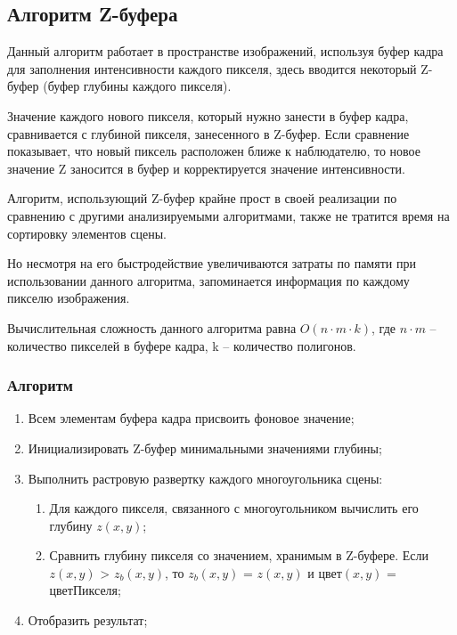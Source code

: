 \documentclass[a4paper,14pt]{extreport}
\begin{document}
		\subsection{Алгоритм Z-буфера}
		Данный алгоритм работает в пространстве изображений, используя буфер
кадра для заполнения интенсивности каждого пикселя, здесь вводится
некоторый Z-буфер (буфер глубины каждого пикселя).
\par Значение каждого нового пикселя, который нужно занести в буфер кадра,
сравнивается с глубиной пикселя, занесенного в Z-буфер. Если сравнение
показывает, что новый пиксель расположен ближе к наблюдателю, то новое
значение Z заносится в буфер и корректируется значение интенсивности.
\par Алгоритм, использующий Z-буфер крайне прост в своей реализации по
сравнению с другими анализируемыми алгоритмами, также не тратится время
на сортировку элементов сцены.
\par Но несмотря на его быстродействие увеличиваются затраты по памяти при
использовании данного алгоритма, запоминается информация по каждому
пикселю изображения.
\par Вычислительная сложность данного алгоритма равна 
\begin{math}
O(n\cdot m\cdot k)
\end{math}, где
\begin{math}
n\cdot m
\end{math} –
количество пикселей в буфере кадра, k – количество полигонов.
\subsubsection{Алгоритм}
\begin{enumerate}
	\item  Всем элементам буфера кадра присвоить фоновое значение;
	\item Инициализировать Z-буфер минимальными значениями глубины;
	\item Выполнить растровую развертку каждого многоугольника сцены:
	\begin{enumerate}
		\item   Для каждого пикселя, связанного с многоугольником вычислить его
глубину \begin{math}
z(x, y)
\end{math};
		\item  Сравнить глубину пикселя со значением, хранимым в Z-буфере. Если
\begin{math}
z(x, y)
\end{math} > \begin{math}
z_b(x, y)
\end{math}, то \begin{math}
z_b(x, y)
\end{math} = \begin{math}
z(x, y)
\end{math} и цвет\begin{math}
(x, y)
\end{math} = цветПикселя;
	\end{enumerate}
	\item Отобразить результат;
\end{enumerate} 
\end{document}
